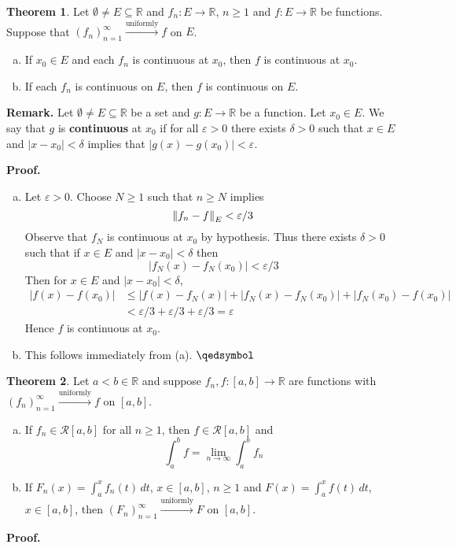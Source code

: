 \documentclass[11pt]{article}
\theoremstyle{definition}
\newtheorem{thm}{Theorem}[section]
\newcommand{\mbR}{\ensuremath{\mathbb{R}}}
\newcommand{\unif}{\xrightarrow{\text{uniformly}}}
\begin{document}
\begin{thm} 
Let $\emptyset \ne E \subseteq \mbR$ and $f_n : E \to \mbR$, $n \geq 1$ and $f : E \to \mbR$ be functions. Suppose that $(f_n)_{n=1}^\infty \unif f$ on $E$.
\begin{enumerate}[(a)]  \vspace{-0.2cm}
\item If $x_0 \in E$ and each $f_n$ is continuous at $x_0$, then $f$ is continuous at $x_0$.
\item If each $f_n$ is continuous on $E$, then $f$ is continuous on $E$.
\end{enumerate}
\end{thm}
\textbf{Remark.} Let $\emptyset \ne E \subseteq \mbR$ be a set and $g : E \to \mbR$ be a function. Let $x_0 \in E$. We say that $g$ is \textbf{continuous} at $x_0$ if for all $\varepsilon > 0$ there exists $\delta > 0$ such that \underline{$x \in E$} and $|x - x_0| < \delta$ implies that $|g(x) - g(x_0)| < \varepsilon$. 

\textbf{Proof.} 
\begin{enumerate}[(a)]  \vspace{-0.2cm}
\item Let $\varepsilon > 0$. Choose $N \geq 1$ such that $n \geq N$ implies 
$$\norm{f_n - f}_E < \varepsilon / 3$$
Observe that $f_N$ is continuous at $x_0$ by hypothesis. Thus there exists $\delta > 0$ such that if $x \in E$ and $|x - x_0| < \delta$ then
$$|f_N(x) - f_N(x_0)| < \varepsilon / 3$$
Then for $x \in E$ and $|x - x_0| < \delta$,
\begin{align*}
|f(x) - f(x_0)| & \leq |f(x) - f_N(x)| + |f_N(x) - f_N(x_0)| + |f_N(x_0) - f(x_0)| \\
& < \varepsilon / 3 + \varepsilon / 3 + \varepsilon / 3 = \varepsilon
\end{align*}
Hence $f$ is continuous at $x_0$.
\item This follows immediately from (a). $\qedsymbol$
\end{enumerate}

\begin{thm}
Let $a < b \in \mbR$ and suppose $f_n, f : [a, b] \to \mbR$ are functions with $(f_n)_{n=1}^\infty \unif f$ on $[a, b]$.
\begin{enumerate}[(a)] \vspace{-0.2cm}
\item If $f_n \in \mathcal{R}[a, b]$ for all $n \geq 1$, then $f \in \mathcal{R}[a, b]$ and
$$\int_a^b f = \lim_{n\to\infty} \int_a^b f_n$$
\item If $F_n(x) = \int_a^x f_n(t)\,dt$, $x \in [a, b]$, $n \geq 1$ and $F(x) = \int_a^x f(t)\,dt$, $x \in [a, b]$, then $(F_n)_{n=1}^\infty \unif F$ on $[a, b]$.
\end{enumerate}
\end{thm}
\textbf{Proof.} 
\end{document}
